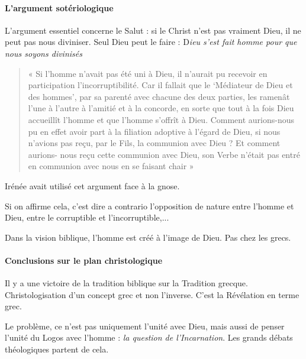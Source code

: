        
      \paragraph{L'argument sotériologique}
      
      L'argument essentiel concerne le Salut : si le Christ n'est pas vraiment Dieu, il ne peut pas nous diviniser. Seul Dieu peut le faire :    D\textit{ieu s'est fait homme pour que nous soyons divinisés} 
      \begin{quote}
       
          
          « Si l'homme n'avait pas été uni à Dieu, il n'aurait pu recevoir en
participation l'incorruptibilité. Car il fallait que le `Médiateur de
Dieu et des hommes', par sa parenté avec chacune des deux parties, les
ramenât l'une à l'autre à l'amitié et à la concorde, en sorte que tout à
la fois Dieu accueillît l'homme et que l'homme s'offrît à Dieu. Comment
aurions-nous pu en effet avoir part à la filiation adoptive à l'égard de
Dieu, si nous n'avions pas reçu, par le Fils, la communion avec Dieu ?
Et comment aurions- nous reçu cette communion avec Dieu, son Verbe
n'était pas entré en communion avec nous en se faisant chair » 
      \end{quote}
      Irénée avait utilisé cet argument face à la gnose.
      
      Si on affirme cela, c'est dire a contrario l'opposition de nature entre l'homme et Dieu, entre le corruptible et l'incorruptible,...
      
      Dans la vision biblique, l'homme est créé à l'image de Dieu. Pas chez les grecs.
      
      
      
      \paragraph{Conclusions sur le plan christologique}  
      
      \begin{Synthesis}
           Il y a une victoire de la tradition biblique sur la Tradition grecque. Christologisation d'un concept grec et non l'inverse. C'est la Révélation en terme grec. 
      \end{Synthesis}
  
  
  Le problème, ce n'est pas uniquement l'unité avec Dieu, mais aussi de penser l'unité du Logos avec l'homme : \emph{la question de l'Incarnation}. Les grands débats théologiques partent de cela.

